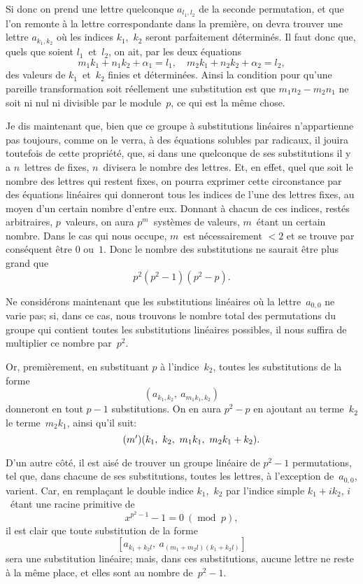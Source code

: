 \documentclass[leqno,12pt]{book}[2005/09/16]
\newcommand{\Tag}[1]{\tag*{\ensuremath{#1}}}
\DeclareMathOperator{\Mod}{mod\;}
\renewcommand{\mod}{\Mod}
\begin{document}
Si donc on prend une lettre quelconque $a_{l_{1},l_{2}}$ de la seconde permutation,
et que l'on remonte à la lettre correspondante dans la
première, on devra trouver une lettre $a_{k_{1},k_{2}}$ où les indices $k_{1}$,~$k_{2}$
seront parfaitement déterminés. Il faut donc que, quels que soient
$l_{1}$~et~$l_{2}$, on ait, par les deux équations
\[
m_{1}k_{1} + n_{1}k_{2} + \alpha_{1} = l_{1}, \quad
m_{2}k_{1} + n_{2}k_{2} + \alpha_{2} = l_{2},
\]
des valeurs de $k_{1}$~et~$k_{2}$ finies et déterminées. Ainsi la condition
pour qu'une pareille transformation soit réellement une substitution
est que $m_{1}n_{2} - m_{2}n_{1}$ ne soit ni nul ni divisible par le module~$p$,
ce qui est la même chose.

Je dis maintenant que, bien que ce groupe à substitutions
linéaires n'appartienne pas toujours, comme on le verra, à des
équations solubles par radicaux, il jouira toutefois de cette propriété,
que, si dans une quelconque de ses substitutions il y a $n$~lettres
de fixes, $n$~divisera le nombre des lettres. Et, en effet, quel
que soit le nombre des lettres qui restent fixes, on pourra exprimer
cette circonstance par des équations linéaires qui donneront
tous les indices de l'une des lettres fixes, au moyen d'un certain
nombre d'entre eux. Donnant à chacun de ces indices, restés arbitraires,
$p$~valeurs, on aura $p^{m}$~systèmes de valeurs, $m$~étant un certain
nombre. Dans le cas qui nous occupe, $m$~est nécessairement
$< 2$ et se trouve par conséquent être $0$ ou~$1$. Donc le nombre des
substitutions ne saurait être plus grand que
\[
p^{2}(p^{2} - 1)(p^{2} - p).
\]

Ne considérons maintenant que les substitutions linéaires où la
lettre~$a_{0,0}$ ne varie pas; si, dans ce cas, nous trouvons le nombre
total des permutations du groupe qui contient toutes les substitutions
linéaires possibles, il nous suffira de multiplier ce nombre
par~$p^{2}$.

Or, premièrement, en substituant $p$ à l'indice~$k_{2}$, toutes les
substitutions de la forme
\[
(a_{k_{1}, k_{2}},\ a_{m_{1}k_{1}, k_{2}})
\]
donneront en tout $p - 1$ substitutions. On en aura $p^{2} - p$ en
ajoutant au terme~$k_{2}$ le terme~$m_{2}k_{1}$, ainsi qu'il suit:
\[
\Tag{(m')}
(k_{1},\ k_{2},\ m_{1}k_{1},\ m_{2}k_{1} + k_{2}).
\]

D'un autre côté, il est aisé de trouver un groupe linéaire
de $p^{2} - 1$ permutations, tel que, dans chacune de ses substitutions,
toutes les lettres, à l'exception de~$a_{0,0}$, varient. Car, en
remplaçant le double indice $k_{1}$,~$k_{2}$ par l'indice simple $k_{1} + ik_{2}$,
$i$~étant une racine primitive de
\[
x^{p^{2}-1}\! - 1 = 0\ (\mod p),
\]
il est clair que toute substitution de la forme
\[
[a_{k_{1}+k_{2} l},\ a_{(m_{1}+m_{2}l)(k_{1}+k_{2}l)}]
\]
sera une substitution linéaire; mais, dans ces substitutions, aucune
lettre ne reste à la même place, et elles sont au nombre
de~$p^{2} - 1$.
\end{document}

